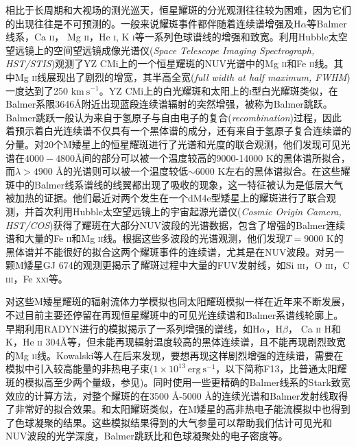 相比于长周期和大视场的测光巡天，恒星耀斑的分光观测往往较为困难，因为它们的出现往往是不可预测的。一般来说耀斑事件都伴随着连续谱增强及H$\alpha$等Balmer线系，Ca \textsc{ii}， Mg \textsc{ii}，He \textsc{i}, K \textsc{i}等一系列色球谱线的增强和致宽\parencite{Eason1992}。\textcite{Hawley2007}利用Hubble太空望远镜上的空间望远镜成像光谱仪(\textit{Space Telescope Imaging Spectrograph, HST/STIS})观测了YZ CMi上的一个恒星耀斑的NUV光谱中的Mg \textsc{ii}和Fe \textsc{ii}线。其中Mg \textsc{ii}线展现出了剧烈的增宽，其半高全宽(\textit{full width at half maximum, FWHM})一度达到了250 $\mathrm{km}\  \mathrm{s}^{-1}$。YZ CMi上的白光耀斑和太阳上的\textsc{i}型白光耀斑类似，在Balmer系限3646\mbox{\AA}附近出现蓝段连续谱辐射的突然增强，被称为Balmer跳跃\parencite{Kowalski2010}。Balmer跳跃一般认为来自于氢原子与自由电子的复合(\textit{recombination})过程，因此着预示着白光连续谱不仅具有一个黑体谱的成分，还有来自于氢原子复合连续谱的分量\parencite{Kowalski2012}。\textcites{Kowalski2013}对20个M矮星上的恒星耀斑进行了光谱和光度的联合观测，他们发现可见光谱在$4000-4800$\mbox{\AA}间的部分可以被一个温度较高的9000-14000 K的黑体谱所拟合，而$\lambda>4900$ \mbox{\AA}的光谱则可以被一个温度较低$\sim6000$ K左右的黑体谱拟合。在这些耀斑中的Balmer线系谱线的线翼都出现了吸收的现象，这一特征被认为是低层大气被加热的证据。他们最近对两个发生在一个dM4e型矮星上的耀斑进行了联合观测，并首次利用Hubble太空望远镜上的宇宙起源光谱仪(\textit{Cosmic Origin Camera, HST/COS})获得了耀斑在大部分NUV波段的光谱数据，包含了增强的Balmer连续谱和大量的Fe \textsc{ii}和Mg \textsc{ii}线\parencite{Kowalski2019}。根据这些多波段的光谱观测，他们发现$T = 9000$ K的黑体谱并不能很好的拟合这两个耀斑事件的连续谱，尤其是在NUV波段。\textcite{Froning2019}对另一颗M矮星GJ 674的观测更揭示了耀斑过程中大量的FUV发射线，如Si \textsc{iii}，O \textsc{iii}，C \textsc{iii}，Fe \textsc{xxi}等。

对这些M矮星耀斑的辐射流体力学模拟也同太阳耀斑模拟一样在近年来不断发展，不过目前主要还停留在再现恒星耀斑中的可见光连续谱和Balmer系谱线轮廓上。早期利用RADYN进行的模拟揭示了一系列增强的谱线，如H$\alpha$，H$\beta$， Ca \textsc{ii} H和K，He \textsc{ii} 304\mbox{\AA}等，但未能再现辐射温度较高的黑体连续谱\parencite{Allred2006}，且不能再现剧烈致宽的Mg \textsc{ii}线\parencite{Hawley2007}。Kowalski等人在后来发现，要想再现这样剧烈增强的连续谱，需要在模拟中引入较高能量的非热电子束($1\times10^{13}\ \mathrm{erg}\ \mathrm{s}^{-1}$，以下简称F13，比普通太阳耀斑的模拟高至少两个量级，参见\cite{Kowalski2015})。同时使用一些更精确的Balmer线系的Stark致宽效应的计算方法，对整个耀斑的在3500 \mbox{\AA}-5000 \mbox{\AA}的连续光谱和Balmer发射线取得了非常好的拟合效果\parencite{Kowalski2015,Kowalski2016,Kowalski2017b}。和太阳耀斑类似，在M矮星的高非热电子能流模拟中也得到了色球凝聚的结果。这些模拟结果得到的大气参量可以帮助我们估计可见光和NUV波段的光学深度，Balmer跳跃比和色球凝聚处的电子密度等\parencite{Kowalski2018a}。
